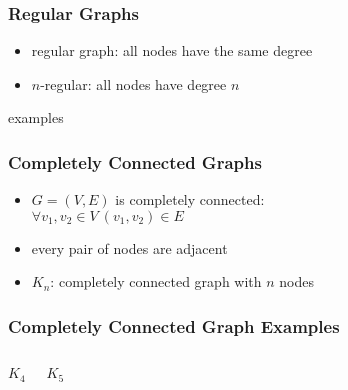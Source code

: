\documentclass[dvipsnames]{beamer}
\begin{document}
\begin{frame}
  \frametitle{Regular Graphs}

  \begin{itemize}
    \item \alert{regular} graph: all nodes have the same degree
    \item $n$-regular: all nodes have degree $n$
  \end{itemize}

  \begin{exampleblock}{examples}
    \begin{center}
    \end{center}
  \end{exampleblock}
\end{frame}

\begin{frame}
  \frametitle{Completely Connected Graphs}

  \begin{itemize}
    \item $G=(V,E)$ is \alert{completely connected}:\\
      $\forall v_1,v_2 \in V~(v_1,v_2) \in E$
    \item every pair of nodes are adjacent

    \medskip
    \item $K_n$: completely connected graph with $n$ nodes
  \end{itemize}
\end{frame}

\begin{frame}
  \frametitle{Completely Connected Graph Examples}

  \begin{columns}[t]
    \begin{center}
      $K_4$

      \bigskip
    \end{center}

    \begin{center}
      $K_5$

      \bigskip
    \end{center}
  \end{columns}
\end{frame}
\end{document}
